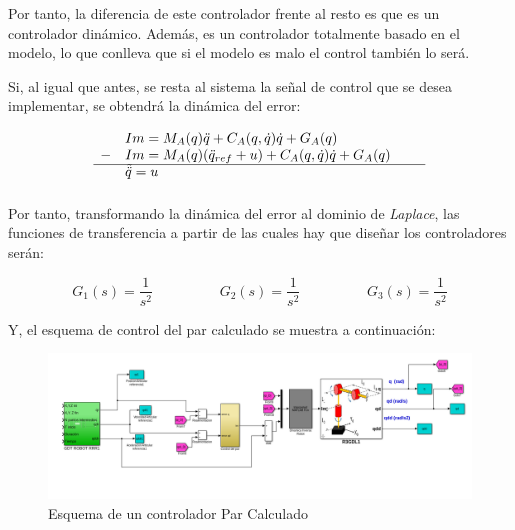 Por tanto, la diferencia de este controlador frente al resto es que es un controlador dinámico. Además, es un controlador totalmente basado en el modelo, lo que conlleva que si el modelo es malo el control también lo será.

Si, al igual que antes, se resta al sistema la señal de control que se desea implementar, se obtendrá la dinámica del error:

\begin{equation}
\begin{array}{llll}
& Im=M_{A}(q)\ddot{q} + C_{A}(q,\dot{q})\dot{q} + G_{A}(q) \\

- & Im=M_{A}(q)(\ddot{q}_{ref}+u) + C_{A}(q,\dot{q})\dot{q} + G_{A}(q) \\

\cline{1-4}

\vspace{0.2cm}

& \tilde{\ddot{q}} = u & &
\end{array}
\end{equation}



Por tanto, transformando la dinámica del error al dominio de \textit{Laplace}, las funciones de transferencia a partir de las cuales hay que diseñar los controladores serán:

\begin{equation}
G_{1}(s)=\frac{1}{s^{2}} \hspace{2cm} G_{2}(s)=\frac{1}{s^{2}} \hspace{2cm} G_{3}(s)=\frac{1}{s^{2}}
\end{equation}



Y, el esquema de control del par calculado se muestra a continuación:



\begin{figure}[h!]
	
	\centering
	
	\includegraphics[width=.8\textwidth]{montaje_parcalcul}
	
	\caption{Esquema de un controlador Par Calculado}
	
\end{figure}



